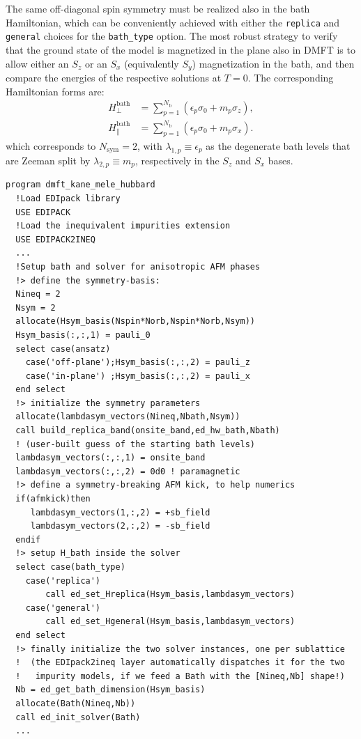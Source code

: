 \documentclass[edipack_sp.tex]{subfiles}
\begin{document}
The same off-diagonal spin symmetry must be realized also in
the bath Hamiltonian, which can be conveniently achieved with
either the \texttt{replica} and \texttt{general} choices for 
the \texttt{bath\_type} option. The most robust strategy to
verify that the ground state of the model is magnetized in the
plane also in DMFT is to allow either an $S_z$ or an $S_x$ (equivalently $S_y$) magnetization in the bath, and then
compare the energies of the respective solutions at $T=0$. 
The corresponding Hamiltonian forms are:
\begin{align}
    H^\mathrm{bath}_\perp &= 
        \sum_{p=1}^{N_\mathrm{b}}(\epsilon_p \sigma_0 + m_p \sigma_z), 
        \label{eq:afmz_dmft_ansatz} \\[1mm]
    H^\mathrm{bath}_\parallel &= 
        \sum_{p=1}^{N_\mathrm{b}}(\epsilon_p \sigma_0 + m_p \sigma_x).
        \label{eq:afmx_dmft_ansatz}
\end{align}
which corresponds to $N_\mathrm{sym}=2$, with
$\lambda_{1,p} \equiv \epsilon_p$ as the degenerate
bath levels that are Zeeman split by $\lambda_{2,p} \equiv m_p$, respectively in the $S_z$ and $S_x$ bases.

\begin{lstlisting}[style=fstyle,numbers=none,basicstyle={\scriptsize\ttfamily}]
program dmft_kane_mele_hubbard
  !Load EDIpack library 
  USE EDIPACK
  !Load the inequivalent impurities extension
  USE EDIPACK2INEQ
  ...
  !Setup bath and solver for anisotropic AFM phases
  !> define the symmetry-basis:
  Nineq = 2
  Nsym = 2
  allocate(Hsym_basis(Nspin*Norb,Nspin*Norb,Nsym))
  Hsym_basis(:,:,1) = pauli_0
  select case(ansatz)
    case('off-plane');Hsym_basis(:,:,2) = pauli_z
    case('in-plane') ;Hsym_basis(:,:,2) = pauli_x
  end select
  !> initialize the symmetry parameters
  allocate(lambdasym_vectors(Nineq,Nbath,Nsym))
  call build_replica_band(onsite_band,ed_hw_bath,Nbath)
  ! (user-built guess of the starting bath levels)
  lambdasym_vectors(:,:,1) = onsite_band 
  lambdasym_vectors(:,:,2) = 0d0 ! paramagnetic
  !> define a symmetry-breaking AFM kick, to help numerics
  if(afmkick)then
     lambdasym_vectors(1,:,2) = +sb_field
     lambdasym_vectors(2,:,2) = -sb_field
  endif
  !> setup H_bath inside the solver
  select case(bath_type)
    case('replica')
        call ed_set_Hreplica(Hsym_basis,lambdasym_vectors)
    case('general')
        call ed_set_Hgeneral(Hsym_basis,lambdasym_vectors)
  end select
  !> finally initialize the two solver instances, one per sublattice
  !  (the EDIpack2ineq layer automatically dispatches it for the two
  !   impurity models, if we feed a Bath with the [Nineq,Nb] shape!)
  Nb = ed_get_bath_dimension(Hsym_basis)
  allocate(Bath(Nineq,Nb))
  call ed_init_solver(Bath)
  ... 
\end{lstlisting}
\end{document}

